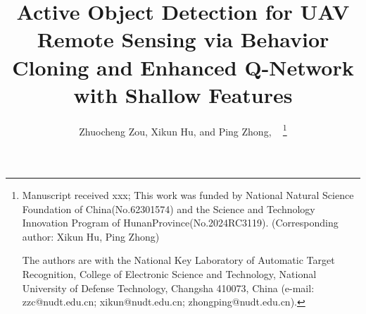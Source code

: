 \documentclass[lettersize,journal]{IEEEtran}
\begin{document}
\title{Active Object Detection for UAV Remote Sensing via Behavior Cloning and Enhanced Q-Network with Shallow Features}

\author{Zhuocheng Zou, Xikun Hu, and Ping Zhong, ~
\thanks{Manuscript received xxx; This work was funded by National Natural Science Foundation of China(No.62301574) and the Science and Technology Innovation Program of HunanProvince(No.2024RC3119). (Corresponding author: Xikun Hu, Ping Zhong)



The authors are with the National Key Laboratory of Automatic Target Recognition, College of Electronic Science and Technology, National University of Defense Technology, Changsha 410073, China (e-mail: zzc@nudt.edu.cn; xikun@nudt.edu.cn; zhongping@nudt.edu.cn).}}


\end{document}
